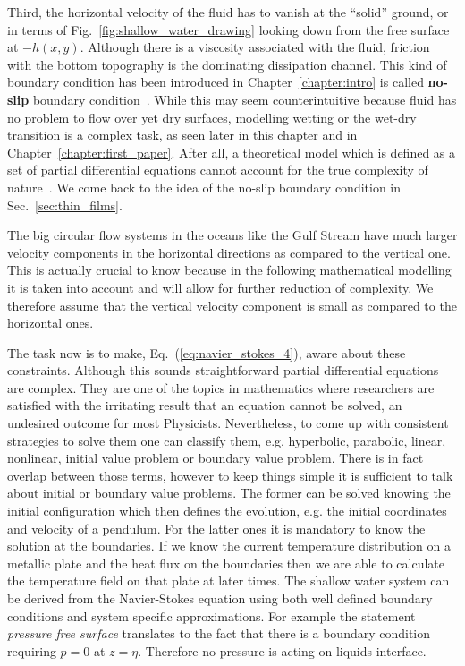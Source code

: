 Third, the horizontal velocity of the fluid has to vanish at the ``solid'' ground, or in terms of Fig.~\ref{fig:shallow_water_drawing} looking down from the free surface at $-h(x,y)$.
Although there is a viscosity associated with the fluid, friction with the bottom topography is the dominating dissipation channel.
This kind of boundary condition has been introduced in Chapter~\ref{chapter:intro} is called \textbf{no-slip} boundary condition~\cite{richardsonNoslipBoundaryCondition1973, degennesFluidWallSlippage2002, salmonLatticeBoltzmannMethod1999}.
While this may seem counterintuitive because fluid has no problem to flow over yet dry surfaces, modelling wetting or the wet-dry transition is a complex task, as seen later in this chapter and in Chapter~\ref{chapter:first_paper}.
After all, a theoretical model which is defined as a set of partial differential equations cannot account for the true complexity of nature~\cite{scrivenPhysicsApplicationsDIP1988}.
We come back to the idea of the no-slip boundary condition in Sec.~\ref{sec:thin_films}.

The big circular flow systems in the oceans like the Gulf Stream have much larger velocity components in the horizontal directions as compared to the vertical one.  
This is actually crucial to know because in the following mathematical modelling it is taken into account and will allow for further reduction of complexity.
We therefore assume that the vertical velocity component is small as compared to the horizontal ones.

The task now is to make, Eq.~(\ref{eq:navier_stokes_4}), aware about these constraints.
Although this sounds straightforward partial differential equations are complex. 
They are one of the topics in mathematics where researchers are satisfied with the irritating result that an equation cannot be solved, an undesired outcome for most Physicists.
Nevertheless, to come up with consistent strategies to solve them one can classify them, e.g. hyperbolic, parabolic, linear, nonlinear, initial value problem or boundary value problem.
There is in fact overlap between those terms, however to keep things simple it is sufficient to talk about initial or boundary value problems.
The former can be solved knowing the initial configuration which then defines the evolution, e.g. the initial coordinates and velocity of a pendulum. 
For the latter ones it is mandatory to know the solution at the boundaries. 
If we know the current temperature distribution on a metallic plate and the heat flux on the boundaries then we are able to calculate the temperature field on that plate at later times.
The shallow water system can be derived from the Navier-Stokes equation using both well defined boundary conditions and system specific approximations.
For example the statement \textit{pressure free surface} translates to the fact that there is a boundary condition requiring $p = 0$ at $z = \eta$. 
Therefore no pressure is acting on liquids interface.

